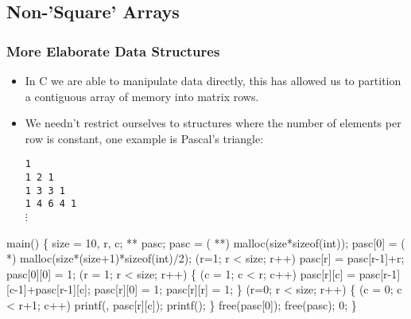 \documentclass[smaller,table]{beamer} %
\begin{document}
\subsection{Non-'Square' Arrays}
\begin{frame}
\frametitle{More Elaborate Data Structures}
\begin{itemize}
\item In C we are able to manipulate data directly, this has allowed us to partition a contiguous array of memory into matrix rows.
\item We needn't restrict ourselves to structures where the number of elements per row is constant, one example is Pascal's triangle:\\
\begin{center}
\tt1\\\tt1  2  1\\\tt1  3  3  1\\\tt1  4  6  4  1\\$\vdots$
\end{center}
\end{itemize}
\end{frame}

\begin{frame}[fragile]
\begin{semiverbatim}
\scriptsize
\kr\kl{} main()
\kl\{
\kl   {} size = 10, r, c;
\kl   {} ** pasc;
\kl   pasc = ( **) malloc(size*sizeof(int));
\kl   pasc[0] = ( *) malloc(size*(size+1)*sizeof(int)/2);
\kl   {}
\kl   {} (r=1; r < size; r++) pasc[r] = pasc[r-1]+r;
\kl   pasc[0][0] = 1;
\kl   {} (r = 1; r < size; r++)
\kl   \{
\kl      {} (c = 1; c < r; c++)
\kl         pasc[r][c] = pasc[r-1][c-1]+pasc[r-1][c];
\kl      pasc[r][0] = 1; pasc[r][r] = 1;
\kl   \}
\kl   {} (r=0; r < size; r++)
\kl   \{
\kl      {} (c = 0; c < r+1; c++)
\kl         printf(, pasc[r][c]);
\kl      printf();
\kl   \}
\kl   free(pasc[0]);
\kl   free(pasc);
\kl   {} 0;
\kl\}
\end{semiverbatim}
\end{frame}
\end{document}
